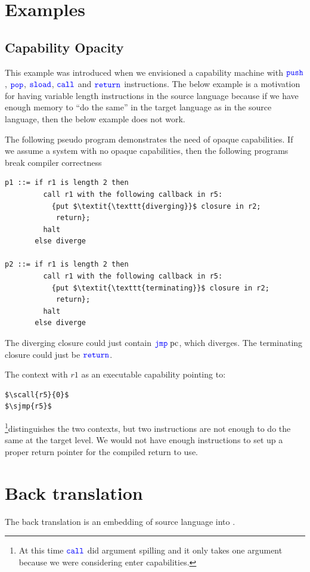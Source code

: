 \documentclass[a4paper]{article}
\newcommand{\sourcecolor}[1]{\color{blue}}
\newcommand{\src}[1]{{\sourcecolor{} #1}}
\newcommand{\zinstr}[1]{\texttt{#1}}
\newcommand{\oneinstr}[2]{
  \ifthenelse{\equal{#2}{}}
  {\zinstr{#1}}
  {\zinstr{#1} \; #2}
}
\newcommand{\twoinstr}[3]{
  \ifthenelse{\equal{#2#3}{}}
  {\zinstr{#1}}
  {\zinstr{#1} \; #2 \; #3}
}
\newcommand{\sreturn}{\zinstr{\src{return}}}
\newcommand{\sjmp}[1]{\oneinstr{\src{jmp}}{#1}}
\newcommand{\spush}[1]{\oneinstr{\src{push}}{#1}}
\newcommand{\spop}[1]{\oneinstr{\src{pop}}{#1}}
\newcommand{\ssload}[2]{\twoinstr{\src{sload}}{#1}{#2}}
\newcommand{\scall}[2]{\twoinstr{\src{call}}{#1}{#2}}
\newcommand{\pcreg}{\mathrm{pc}}
\begin{document}
\clearpage
\section{Examples}
\subsection{Capability Opacity}
\label{subsec:capability-opacity}
This example was introduced when we envisioned a capability machine with $\spush{}$, $\spop{}$, $\ssload{}{}$, $\scall{}{}$ and $\sreturn$ instructions. The below example is a motivation for having variable length instructions in the source language because if we have enough memory to ``do the same'' in the target language as in the source language, then the below example does not work.

The following pseudo program demonstrates the need of opaque capabilities. If we assume a system with no opaque capabilities, then the following programs break compiler correctness
\begin{lstlisting}[basicstyle=\sourcecolor{}\ttfamily] 
p1 ::= if r1 is length 2 then
         call r1 with the following callback in r5:
           {put $\textit{\texttt{diverging}}$ closure in r2;
            return};
         halt
       else diverge

p2 ::= if r1 is length 2 then
         call r1 with the following callback in r5:
           {put $\textit{\texttt{terminating}}$ closure in r2;
            return};
         halt
       else diverge
\end{lstlisting}
The diverging closure could just contain $\sjmp{\pcreg}$, which diverges. The terminating closure could just be $\sreturn$.

The context with $r1$ as an executable capability pointing to:
\begin{lstlisting}[basicstyle=\sourcecolor{}\ttfamily] 
$\scall{r5}{0}$
$\sjmp{r5}$
\end{lstlisting}
\footnote{At this time $\scall{}{}$ did argument spilling and it only takes one argument because we were considering enter capabilities.}distinguishes the two contexts, but two instructions are not enough to do the same at the target level. We would not have enough instructions to set up a proper return pointer for the compiled return to use.

\clearpage
\section{Back translation}
The back translation is an embedding of source language into .
\end{document}
